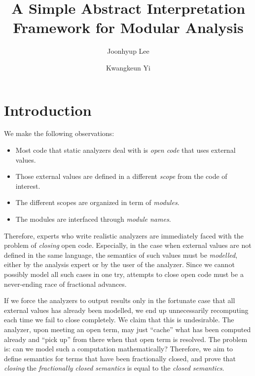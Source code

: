 \documentclass[acmsmall,screen,review]{acmart}\settopmatter{printfolios=true,printccs=false,printacmref=false}
\title{A Simple Abstract Interpretation Framework for Modular Analysis}
\author{Joonhyup Lee}
\author{Kwangkeun Yi}
\theoremstyle{acmdefinition}
\begin{document}
\maketitle
\section{Introduction}
We make the following observations:
\begin{itemize}
  \item Most code that static analyzers deal with is \emph{open code} that uses external values.
  \item Those external values are defined in a different \emph{scope} from the code of interest.
  \item The different scopes are organized in term of \emph{modules}.
  \item The modules are interfaced through \emph{module names}.
\end{itemize}
Therefore, experts who write realistic analyzers are immediately faced with the problem of \emph{closing} open code.
Especially, in the case when external values are not defined in the same language, the semantics of such values must be \emph{modelled}, either by the analysis expert or by the user of the analyzer.
Since we cannot possibly model all such cases in one try, attempts to close open code must be a never-ending race of fractional advances.

If we force the analyzers to output results only in the fortunate case that all external values has already been modelled, we end up unnecessarily recomputing each time we fail to close completely.
We claim that this is undesirable.
The analyzer, upon meeting an open term, may just ``cache'' what has been computed already and ``pick up'' from there when that open term is resolved.
The problem is: can we model such a computation {mathematically}?
Therefore, we aim to define semantics for terms that have been fractionally closed, and prove that \emph{closing} the \emph{fractionally closed semantics} is equal to the \emph{closed semantics}.
\end{document}
